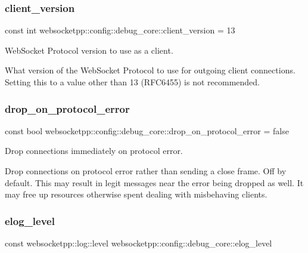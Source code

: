 \subsubsection{\texorpdfstring{client\+\_\+version}{client\_version}}
{\footnotesize\ttfamily const int websocketpp\+::config\+::debug\+\_\+core\+::client\+\_\+version = 13\hspace{0.3cm}{\ttfamily [static]}}



Web\+Socket Protocol version to use as a client. 

What version of the Web\+Socket Protocol to use for outgoing client connections. Setting this to a value other than 13 (R\+F\+C6455) is not recommended. \mbox{\label{structwebsocketpp_1_1config_1_1debug__core_a0f046a730b161555c644dc40df9ea870}} 
\subsubsection{\texorpdfstring{drop\+\_\+on\+\_\+protocol\+\_\+error}{drop\_on\_protocol\_error}}
{\footnotesize\ttfamily const bool websocketpp\+::config\+::debug\+\_\+core\+::drop\+\_\+on\+\_\+protocol\+\_\+error = false\hspace{0.3cm}{\ttfamily [static]}}



Drop connections immediately on protocol error. 

Drop connections on protocol error rather than sending a close frame. Off by default. This may result in legit messages near the error being dropped as well. It may free up resources otherwise spent dealing with misbehaving clients. \mbox{\label{structwebsocketpp_1_1config_1_1debug__core_a0f2c26586b53faefef4386473092886e}} 
\subsubsection{\texorpdfstring{elog\+\_\+level}{elog\_level}}
{\footnotesize\ttfamily const websocketpp\+::log\+::level websocketpp\+::config\+::debug\+\_\+core\+::elog\+\_\+level\hspace{0.3cm}{\ttfamily [static]}}

